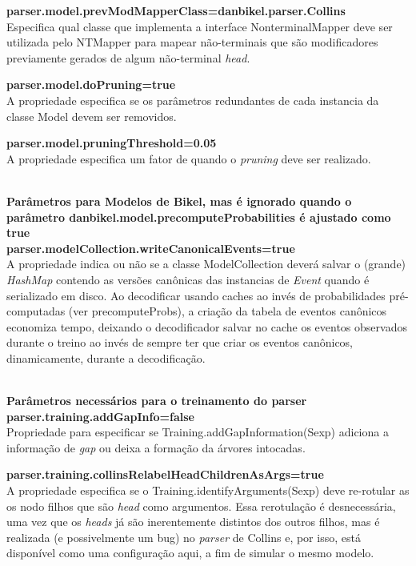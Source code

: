 \textbf{parser.model.prevModMapperClass=danbikel.parser.Collins}\\
Especifica qual classe que implementa a interface NonterminalMapper deve ser utilizada pelo NTMapper para mapear não-terminais que são modificadores previamente gerados de algum não-terminal \emph{head}.

\textbf{parser.model.doPruning=true}\\
A propriedade especifica se os parâmetros redundantes de cada instancia da classe Model devem ser removidos.

\textbf{parser.model.pruningThreshold=0.05}\\
A propriedade especifica um fator de quando o \emph{pruning} deve ser realizado.

\HRule \\

\textbf{Parâmetros para Modelos de Bikel, mas é ignorado quando o parâmetro danbikel.model.precomputeProbabilities é ajustado como true}\\

\textbf{parser.modelCollection.writeCanonicalEvents=true}\\
A propriedade indica ou não se a classe ModelCollection deverá salvar o (grande) \emph{HashMap} contendo as versões canônicas das instancias de \emph{Event} quando é serializado em disco. Ao decodificar usando caches ao invés de probabilidades pré-computadas (ver precomputeProbs), a criação da tabela de eventos canônicos economiza tempo, deixando o decodificador salvar no cache os eventos observados durante o treino ao invés de sempre ter que criar os eventos canônicos, dinamicamente, durante a decodificação.

\HRule \\

\textbf{Parâmetros necessários para o treinamento do parser}\\

\textbf{parser.training.addGapInfo=false}\\
Propriedade para especificar se Training.addGapInformation(Sexp) adiciona a informação de \emph{gap} ou deixa a formação da árvores intocadas.

\textbf{parser.training.collinsRelabelHeadChildrenAsArgs=true}\\
A propriedade especifica se o Training.identifyArguments(Sexp) deve re-rotular as os nodo filhos que são \emph{head} como argumentos. Essa rerotulação é desnecessária, uma vez que os \emph{heads} já são inerentemente distintos dos outros filhos, mas é realizada (e possivelmente um bug) no \emph{parser} de Collins e, por isso, está disponível como uma configuração aqui, a fim de simular o mesmo modelo.

